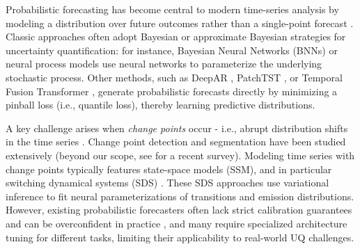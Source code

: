 Probabilistic forecasting has become central to modern time-series analysis by modeling a distribution over future outcomes rather than a single-point forecast \citep{benidis2022deep}. Classic approaches often adopt Bayesian or approximate Bayesian strategies for uncertainty quantification: for instance, Bayesian Neural Networks (BNNs) \citep{wang2019deep, wu2021quantifying, gal2017concrete} or neural process models \citep{garnelo2018conditional, sun2024data} use neural networks to parameterize the underlying stochastic process. Other methods, such as DeepAR \citep{salinas2020deepar}, PatchTST \citep{nie2023patchtst}, or Temporal Fusion Transformer \citep{lim2021temporal}, generate probabilistic forecasts directly by minimizing a pinball loss (i.e., quantile loss), thereby learning predictive distributions.


A key challenge arises when \textit{change points} occur - i.e., abrupt distribution shifts in the time series \citep{montanez2015inertial}. Change point detection and segmentation have been studied extensively (beyond our scope, see \citep{aminikhanghahi2017survey} for a recent survey). Modeling time series with change points typically features state-space models (SSM), and in particular switching dynamical systems (SDS) \citep{johnson2016composing, ansari2021deep, liu2023graph}. These SDS approaches use variational inference to fit neural parameterizations of transitions and emission distributions. However, existing probabilistic forecasters often lack strict calibration guarantees and can be overconfident in practice \citep{lakshminarayanan2017simple}, and many require specialized architecture tuning for different tasks, limiting their applicability to real-world UQ challenges.


